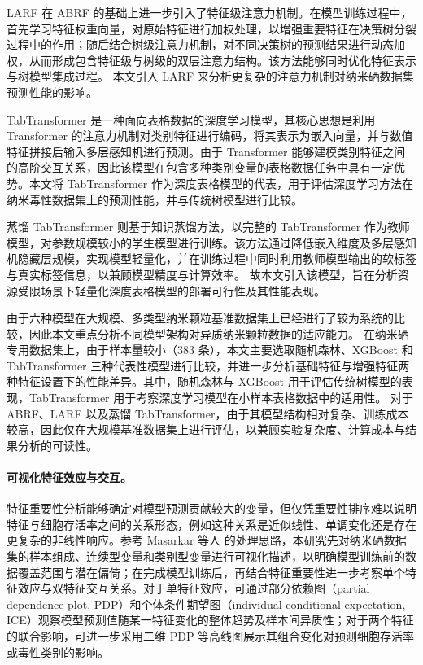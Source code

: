 \documentclass[letterpaper]{article}
\begin{document}
LARF 在 ABRF 的基础上进一步引入了特征级注意力机制。在模型训练过程中，首先学习特征权重向量，对原始特征进行加权处理，以增强重要特征在决策树分裂过程中的作用；随后结合树级注意力机制，对不同决策树的预测结果进行动态加权，从而形成包含特征级与树级的双层注意力结构。该方法能够同时优化特征表示与树模型集成过程。
本文引入 LARF 来分析更复杂的注意力机制对纳米硒数据集预测性能的影响。

TabTransformer 是一种面向表格数据的深度学习模型，其核心思想是利用 Transformer 的注意力机制对类别特征进行编码，将其表示为嵌入向量，并与数值特征拼接后输入多层感知机进行预测。由于 Transformer 能够建模类别特征之间的高阶交互关系，因此该模型在包含多种类别变量的表格数据任务中具有一定优势。本文将 TabTransformer 作为深度表格模型的代表，用于评估深度学习方法在纳米毒性数据集上的预测性能，并与传统树模型进行比较。

蒸馏 TabTransformer 则基于知识蒸馏方法，以完整的 TabTransformer 作为教师模型，对参数规模较小的学生模型进行训练。该方法通过降低嵌入维度及多层感知机隐藏层规模，实现模型轻量化，并在训练过程中同时利用教师模型输出的软标签与真实标签信息，以兼顾模型精度与计算效率。
故本文引入该模型，旨在分析资源受限场景下轻量化深度表格模型的部署可行性及其性能表现。

由于六种模型在大规模、多类型纳米颗粒基准数据集上已经进行了较为系统的比较，因此本文重点分析不同模型架构对异质纳米颗粒数据的适应能力。
在纳米硒专用数据集上，由于样本量较小（383 条），本文主要选取随机森林、XGBoost 和 TabTransformer 三种代表性模型进行比较，并进一步分析基础特征与增强特征两种特征设置下的性能差异。其中，随机森林与 XGBoost 用于评估传统树模型的表现，TabTransformer 用于考察深度学习模型在小样本表格数据中的适用性。
对于 ABRF、LARF 以及蒸馏 TabTransformer，由于其模型结构相对复杂、训练成本较高，因此仅在大规模基准数据集上进行评估，以兼顾实验复杂度、计算成本与结果分析的可读性。

\paragraph{可视化特征效应与交互。}
特征重要性分析能够确定对模型预测贡献较大的变量，但仅凭重要性排序难以说明特征与细胞存活率之间的关系形态，例如这种关系是近似线性、单调变化还是存在更复杂的非线性响应。参考 Masarkar 等人 \cite{masarkar2024} 的处理思路，本研究先对纳米硒数据集的样本组成、连续型变量和类别型变量进行可视化描述，以明确模型训练前的数据覆盖范围与潜在偏倚；在完成模型训练后，再结合特征重要性进一步考察单个特征效应与双特征交互关系。对于单特征效应，可通过部分依赖图（partial dependence plot, PDP）和个体条件期望图（individual conditional expectation, ICE）观察模型预测值随某一特征变化的整体趋势及样本间异质性；对于两个特征的联合影响，可进一步采用二维 PDP 等高线图展示其组合变化对预测细胞存活率或毒性类别的影响。
\end{document}
